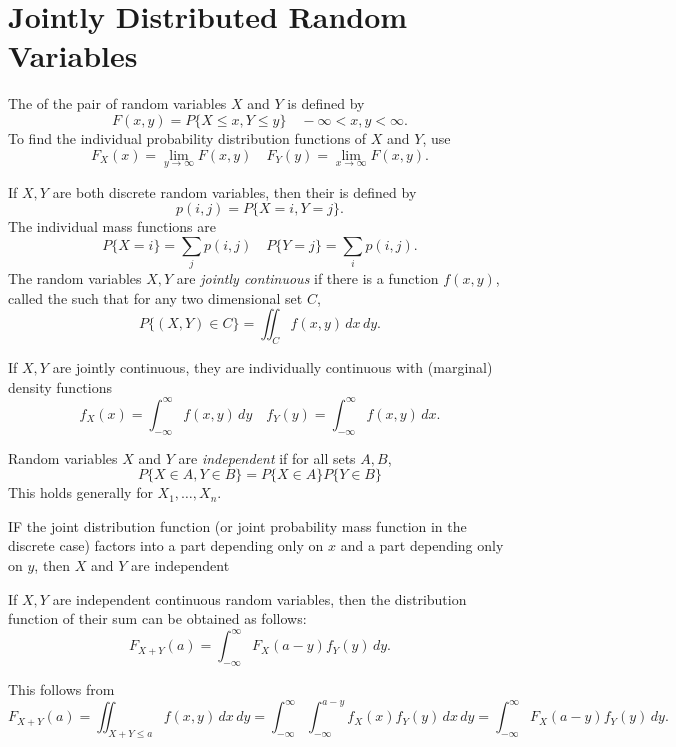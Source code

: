 \documentclass{article}
\begin{document}
\section{Jointly Distributed Random Variables}
\begin{definition}
    The  of the pair of random variables $X$ and $Y$ is defined by
    \[F(x,y)=P\{X\leq x,Y\leq y\}\quad-\infty<x,y<\infty.\]
    To find the individual probability distribution functions of $X$ and $Y$, use 
    \[F_{X}(x)=\lim_{y\rightarrow\infty}F(x,y)\quad F_{Y}(y)=\lim_{x\rightarrow\infty}F(x,y).\]
    \begin{itemize}
        \ii If $X,Y$ are both discrete random variables, then their  is defined by
        \[p(i,j)=P\{X=i,Y=j\}.\]
        The individual mass functions are 
        \[P\{X=i\}=\sum_{j}p(i,j)\quad P\{Y=j\}=\sum_{i}p(i,j).\]
        \ii The random variables $X,Y$ are \emph{jointly continuous} if there is a function $f(x,y)$, called the  such that for any two dimensional set $C$,
        \[P\{(X,Y)\in C\}=\iint_{C}f(x,y)\,dx\,dy.\]
    \end{itemize}
\end{definition}
\begin{theorem}
    If $X,Y$ are jointly continuous, they are individually continuous with (marginal) density functions
    \[f_{X}(x)=\int_{-\infty}^{\infty}f(x,y)\,dy\quad f_{Y}(y)=\int_{-\infty}^{\infty}f(x,y)\,dx.\]
\end{theorem}
\begin{theorem}
    Random variables $X$ and $Y$ are \emph{independent} if for all sets $A,B$,
    \[P\{X\in A,Y\in B\}=P\{X\in A\}P\{Y\in B\}\]
    This holds generally for $X_{1},\dotsc, X_{n}$.
\end{theorem}
\begin{remark}
    IF the joint distribution function (or joint probability mass function in the discrete case) factors into a part depending only on $x$ and a part depending only on $y$, then $X$ and $Y$ are independent
\end{remark}
\begin{theorem}[Convolutions]
    If $X,Y$ are independent continuous random variables, then the distribution function of their sum can be obtained as follows:
    \[F_{X+Y}(a)=\int_{-\infty}^{\infty}F_{X}(a-y)f_{Y}(y)\,dy.\]
\end{theorem}
\begin{remark}
    This follows from \[F_{X+Y}(a)=\iint_{X+Y\leq a}f(x,y)\,dx\,dy=\int_{-\infty}^{\infty}\int_{-\infty}^{a-y}f_{X}(x)f_{Y}(y)\,dx\,dy=\int_{-\infty}^{\infty}F_{X}(a-y)f_{Y}(y)\,dy.\]
\end{remark}
\end{document}
